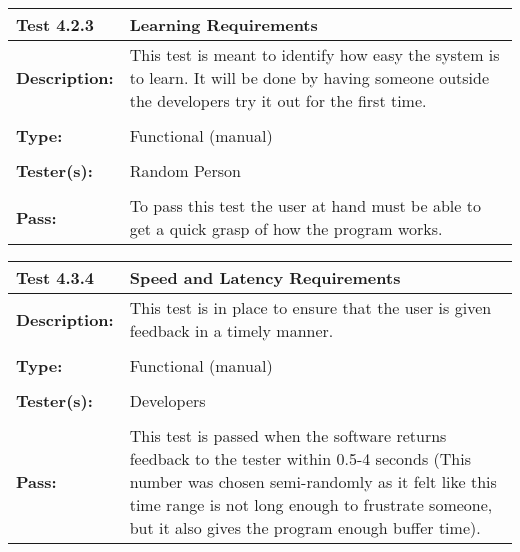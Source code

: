\documentclass{article}
\begin{document}
\begin{tabularx}{\textwidth}{p{2cm}p{9cm}}
\toprule 
{\bf Test 4.2.3} & {\bf Learning Requirements}\\
\midrule
\textbf{Description:} & This test is meant to identify how easy the system is to learn. It will be done by having someone outside the developers try it out for the first time.\\[0.3\baselineskip]
                      &                     \\
\textbf{Type:} & Functional (manual)   \\[0.3\baselineskip]
                      &                     \\
\textbf{Tester(s):} & Random Person \\[0.3\baselineskip]
                      &                     \\
\textbf{Pass:} & To pass this test the user at hand must be able to get a quick grasp of how the program works. \\[0.3\baselineskip]
\end{tabularx}

\begin{tabularx}{\textwidth}{p{2cm}p{9cm}}
\toprule 
{\bf Test 4.3.4} & {\bf Speed and Latency Requirements}\\
\midrule
\textbf{Description:} & This test is in place to ensure that the user is given feedback in a timely manner. \\[0.3\baselineskip]
                      &                     \\
\textbf{Type:} & Functional (manual)   \\[0.3\baselineskip]
                      &                     \\
\textbf{Tester(s):} & Developers \\[0.3\baselineskip]
                      &                     \\
\textbf{Pass:} & This test is passed when the software returns feedback to the tester within 0.5-4 seconds (This number was chosen semi-randomly as it felt like this time range is not long enough to frustrate someone, but it also gives the program enough buffer time). \\[0.3\baselineskip]
\end{tabularx}
\end{document}
